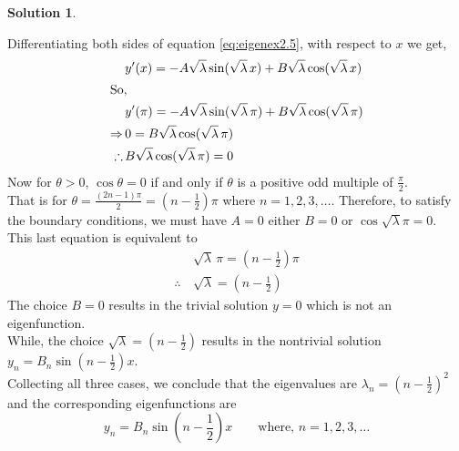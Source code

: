 \documentclass[12pt,a4paper]{article}
\theoremstyle{remark}
\theoremstyle{definition}
\newtheorem*{soln}{Solution}
\begin{document}
\begin{soln}
\begin{enumerate}[label={Case \arabic*:}]
              Differentiating both sides of equation \eqref{eq:eigenex2.5}, with respect to $ x $ we get,
              \begin{align*}
                                & y'(x)=-A\sqrt{\lambda}\sin(\sqrt{\lambda} \,x)+B\sqrt{\lambda}\cos(\sqrt{\lambda} \,x)       \\
                  \intertext{So,}
                                & y'(\pi)=-A\sqrt{\lambda}\sin(\sqrt{\lambda}\, \pi)+B\sqrt{\lambda}\cos(\sqrt{\lambda} \,\pi) \\
                  \Rightarrow\, & 0=B\sqrt{\lambda}\cos(\sqrt{\lambda} \,\pi)                                                  \\
                  \therefore\,  & B\sqrt{\lambda}\cos(\sqrt{\lambda}\, \pi)=0
              \end{align*}
              Now for $ \theta>0 $, $ \cos\theta=0 $ if and only if $ \theta $ is a positive odd multiple of $ \frac{\pi}{2} $.\\
              That is for $\displaystyle \theta =\frac{(2n-1)\pi}{2}=\left( n-\frac{1}{2} \right)\pi $ where $ n=1,2,3,\dots $. Therefore, to satisfy the boundary conditions, we must have $A=0$ either $ B=0 $ or $ \cos \sqrt{\lambda}\pi=0 $.\\
              This last equation is equivalent to
              \begin{align*}
                               & \sqrt{\lambda}\,\pi=\left( n-\frac{1}{2} \right)\pi \\
                  \therefore\, & \sqrt{\lambda}=\left( n-\frac{1}{2} \right)
              \end{align*}
              The choice $ B=0 $ results in the trivial solution $ y=0 $ which is not an eigenfunction.\\
              While, the choice $ \sqrt{\lambda}=\left( n-\frac{1}{2} \right) $ results in the nontrivial solution $ y_n=B_n\sin\left( n-\frac{1}{2} \right)x $.\\

              Collecting all three cases, we conclude that the eigenvalues are $ \lambda_n=(n-\frac{1}{2})^2 $ and the corresponding eigenfunctions are
              \[y_n=B_n\sin\left( n-\frac{1}{2} \right)x \qquad \text{where, } n=1,2,3,\dots\]
    \end{enumerate}
\end{soln}
\end{document}
